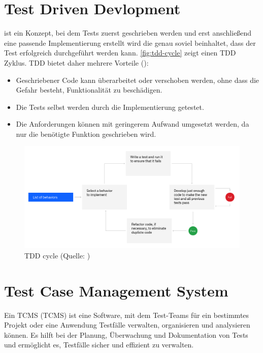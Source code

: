 \documentclass[a4paper, fontsize=11pt, parskip=half, twoside]{scrreprt}
\begin{document}
	
	\section{Test Driven Devlopment}
	 ist ein Konzept, bei dem Tests zuerst geschrieben werden und erst anschließend eine passende Implementierung erstellt wird die genau soviel beinhaltet, dass der Test erfolgreich durchgeführt werden kann.
	\autoref{fig:tdd-cycle} zeigt einen \ac{TDD} Zyklus.
	\ac{TDD} bietet daher mehrere Vorteile (\textcite{ammann_introduction_2016}):
	
	\begin{itemize}
		\item Geschriebener Code kann überarbeitet oder verschoben werden, ohne dass die Gefahr besteht, Funktionalität zu beschädigen.
		\item Die Tests selbst werden durch die Implementierung getestet.
		\item Die Anforderungen können mit geringerem Aufwand umgesetzt werden, da nur die benötigte Funktion geschrieben wird.
	\end{itemize}
	
	\begin{figure}[ht]
		\centering
		\includegraphics[scale=0.25]{assets/tdd-cycle.png}
		\caption{\acl{TDD} cycle (Quelle: \textcite{noauthor_test-driven_nodate})}
		\label{fig:tdd-cycle}
	\end{figure}
	
	\section{Test Case Management System} \label{sec:tcms}
	Ein \acl{TCMS} (\ac{TCMS}) ist eine Software, mit dem Test-Teams für ein bestimmtes Projekt oder eine Anwendung Testfälle verwalten, organisieren und analysieren können.
	Es hilft bei der Planung, Überwachung und Dokumentation von Tests und ermöglicht es, Testfälle sicher und effizient zu verwalten.
	
\end{document}
